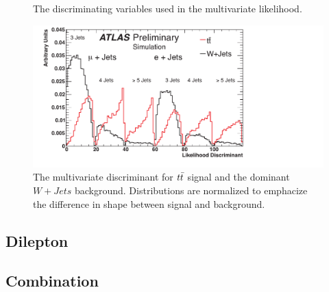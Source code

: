 \begin{figure}
\begin{center}
{    }
  \end{center}
  \caption{The discriminating variables used in the multivariate likelihood.}
  \label{img:DiscriminatingVariables}
\end{figure}


\begin{figure}
  \begin{center}
    \includegraphics[width=.95\linewidth]{figures/xsection/LJetsDiscriminantLikelihood}
  \end{center}
  \caption{The multivariate discriminant for $t\bar{t}$ signal and the dominant $W+Jets$ background.  Distributions are normalized to emphacize the difference in shape between signal and background.}
  \label{img:LJetsLikelihoodDiscriminant}
\end{figure}


\subsection{Dilepton}


\subsection{Combination}



